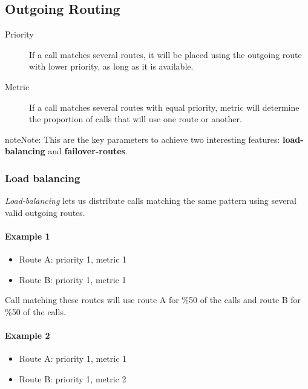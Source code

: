 \documentclass[letterpaper,10pt,english]{sphinxmanual}
\begin{document}
\subsection{Outgoing Routing}
\label{brand/routing/outgoing_routing:routes-metrics}\label{brand/routing/outgoing_routing::doc}\label{brand/routing/outgoing_routing:outgoing-routing}\begin{description}
\item[{Priority}] \leavevmode{}\label{brand/routing/outgoing_routing:term-priority}
If a call matches several routes, it will be placed using the outgoing
route with lower priority, as long as it is available.

\item[{Metric}] \leavevmode{}\label{brand/routing/outgoing_routing:term-metric}
If a call matches several routes with equal priority, metric will determine
the proportion of calls that will use one route or another.

\end{description}

\begin{notice}{note}{Note:}
This are the key parameters to achieve two interesting features:
\textbf{load-balancing} and \textbf{failover-routes}.
\end{notice}


\subsubsection{Load balancing}
\label{brand/routing/outgoing_routing:load-balancing}
\emph{Load-balancing} lets us distribute calls matching the same pattern using
several valid outgoing routes.
\paragraph{Example 1}
\begin{itemize}
\item {} 
Route A: priority 1, metric 1

\item {} 
Route B: priority 1, metric 1

\end{itemize}

Call matching these routes will use route A for \%50 of the calls and route B for
\%50 of the calls.
\paragraph{Example 2}
\begin{itemize}
\item {} 
Route A: priority 1, metric 1

\item {} 
Route B: priority 1, metric 2

\end{itemize}
\end{document}
